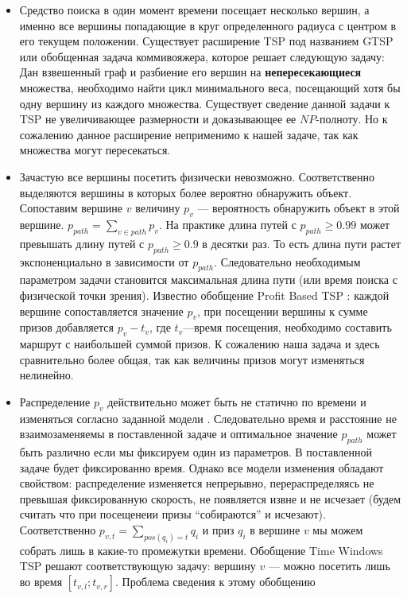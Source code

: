 \begin{itemize}
\item{Средство поиска в один момент времени посещает несколько вершин, а именно все вершины
попадающие в круг определенного радиуса с центром в его текущем положении.
Существует расширение TSP под названием GTSP \cite{ben03} или обобщенная задача коммивояжера,
которое решает следующую задачу:
Дан взвешенный граф и разбиение его вершин на \textbf{непересекающиеся} множества, необходимо
найти цикл минимального веса, посещающий хотя бы одну вершину из каждого множества.
Существует сведение данной задачи к TSP не увеличивающее размерности и доказывающее ее $NP$-полноту.
Но к сожалению данное расширение неприменимо к нашей задаче, так как множества могут пересекаться.}
\item{Зачастую все вершины посетить физически невозможно. 
Соответственно выделяются вершины в которых более вероятно обнаружить объект.
 Сопоставим вершине $v$ величину $p_v$ --- вероятность обнаружить объект в этой вершине.
 $p_{path}=\sum\limits_{v\in path}p_v$. На практике длина путей с $p_{path} \ge 0.99$ может превышать
длину путей с $p_{path} \ge 0.9$ в десятки раз. То есть длина пути растет экспоненциально
в зависимости от $p_{path}$. Следовательно необходимым параметром задачи становится максимальная длина
пути (или время поиска с физической точки зрения). Известно обобщение Profit Based TSP \cite{dew13}:
каждой вершине сопоставляется значение $p_v$, при посещении вершины к сумме призов 
добавляется $p_v-t_v$, где $t_v$---время посещения, необходимо составить маршрут с
наибольшей суммой призов. К сожалению наша задача и здесь сравнительно более общая, так как
величины призов могут изменяться нелинейно.}
\item{Распределение $p_v$ действительно может быть не статично по времени и изменяться согласно
заданной модели \cite{li06}. Следовательно время и расстояние не взаимозаменяемы в поставленной
задаче и
оптимальное значение $p_{path}$ может быть различно если мы фиксируем один из параметров.
В поставленной задаче будет фиксированно время. Однако все модели изменения обладают свойством:
распределение изменяется непрерывно, перераспределяясь не превышая фиксированную скорость,
не появляется извне и не исчезает (будем считать что при посещенеии призы ``собираются'' и исчезают).
Соответственно $p_{v,t}=\sum_{pos(q_i)=t}q_i$ и приз $q_i$ в вершине $v$ мы можем собрать лишь в какие-то
промежутки времени. Обобщение Time Windows TSP \cite{lop13} решают соответствующую задачу:
вершину $v$ --- можно посетить лишь во время $[t_{v,l}; t_{v,r}]$. Проблема сведения к этому обобщению
}
\end{itemize}
